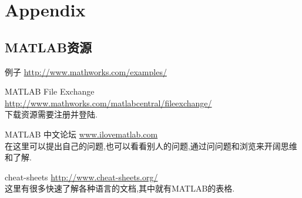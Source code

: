 \appendix
\section{Appendix}

\subsection{MATLAB资源}
\begin{itemize*}
	\item 例子 \url{http://www.mathworks.com/examples/}
    \item MATLAB File Exchange 
                      \url{http://www.mathworks.com/matlabcentral/fileexchange/}\\
          下载资源需要注册并登陆.
    \item MATLAB 中文论坛 \url{www.ilovematlab.com}\\
          在这里可以提出自己的问题,也可以看看别人的问题,通过问问题和浏览来开阔思维和了解.                  
    \item cheat-sheets \url{http://www.cheat-sheets.org/}\\
          这里有很多快速了解各种语言的文档,其中就有MATLAB的表格.
\end{itemize*}
